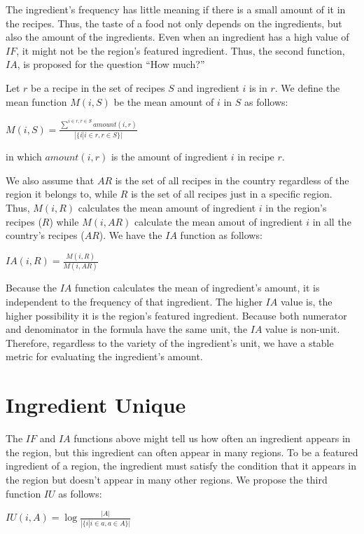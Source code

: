 The ingredient's frequency has little meaning if there is a small amount of it in the recipes. Thus, the taste of a food not only depends on the ingredients, but also the amount of the ingredients. Even when an ingredient has a high value of $IF$, it might not be the region's featured ingredient. Thus, the second function, $IA$, is proposed for the question ``How much?''

Let $r$ be a recipe in the set of recipes $S$ and ingredient $i$ is in $r$. 
We define the mean function $M(i,S)$ be the mean amount of $i$ in $S$ as follows: 
\begin{center}
\smallskip
$M(i,S)= \frac{\displaystyle \sum_{}^{i \in r, r \in S} amount(i,r)}{\displaystyle |\{i|i \in r, r \in S\}|}$
\smallskip
\end{center}

in which $amount(i,r)$ is the amount of ingredient $i$ in recipe $r$.

We also assume that $AR$ is the set of all recipes in the country regardless of the region it belongs to, while $R$ is the set of all recipes just in a specific region. Thus, $M(i,R)$ calculates the mean amount of ingredient $i$ in the region's recipes ($R$) while $M(i,AR)$ calculate the mean amout of ingredient $i$ in all the country's recipes ($AR$). We have the $IA$ function as follows:
\begin{center}
\smallskip
$IA(i,R)= \frac{\displaystyle M(i,R)}{\displaystyle M(i,AR)}$
\smallskip
\end{center}


Because the $IA$ function calculates the mean of ingredient's amount, it is independent to the frequency of that ingredient. The higher $IA$ value is, the higher possibility it is the region's featured ingredient. Because both numerator and denominator in the formula have the same unit, the $IA$ value is non-unit. Therefore, regardless to the variety of the ingredient's unit, we have a stable metric for evaluating the ingredient's amount.

\section{Ingredient Unique}

The $IF$ and $IA$ functions above might tell us how often an ingredient appears in the region, but this ingredient can often appear in many regions. To be a featured ingredient of a region, the ingredient must satisfy the condition that it appears in the region but doesn't appear in many other regions. We propose the third function $IU$ as follows: 
\begin{center}
\smallskip
$IU(i,A)=  \log{\displaystyle \frac{\displaystyle |A|}{\displaystyle |\{i|i \in a, a \in A \}|}}$
\smallskip
\end{center}

